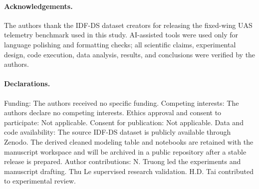 \documentclass[runningheads,a4paper]{llncs}
\begin{document}
\paragraph{Acknowledgements.}
The authors thank the IDF-DS dataset creators for releasing the fixed-wing UAS telemetry benchmark used in this study. AI-assisted tools were used only for language polishing and formatting checks; all scientific claims, experimental design, code execution, data analysis, results, and conclusions were verified by the authors.

\paragraph{Declarations.}
Funding: The authors received no specific funding. Competing interests: The authors declare no competing interests. Ethics approval and consent to participate: Not applicable. Consent for publication: Not applicable. Data and code availability: The source IDF-DS dataset is publicly available through Zenodo. The derived cleaned modeling table and notebooks are retained with the manuscript workspace and will be archived in a public repository after a stable release is prepared. Author contributions: N. Truong led the experiments and manuscript drafting. Thu Le supervised research validation. H.D. Tai contributed to experimental review.
\end{document}
